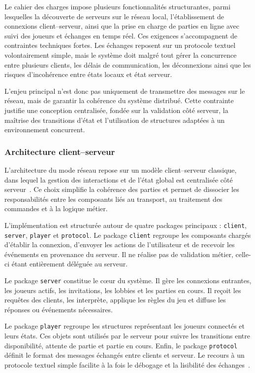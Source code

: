 \documentclass[a4paper]{article}
\begin{document}
Le cahier des charges impose plusieurs fonctionnalités structurantes, parmi lesquelles la découverte de serveurs sur le réseau local, l’établissement de connexions client--serveur, ainsi que la prise en charge de parties en ligne avec suivi des joueurs et échanges en temps réel. Ces exigences s’accompagnent de contraintes techniques fortes. Les échanges reposent sur un protocole textuel volontairement simple, mais le système doit malgré tout gérer la concurrence entre plusieurs clients, les délais de communication, les déconnexions ainsi que les risques d’incohérence entre états locaux et état serveur.

L’enjeu principal n’est donc pas uniquement de transmettre des messages sur le réseau, mais de garantir la cohérence du système distribué. Cette contrainte justifie une conception centralisée, fondée sur la validation côté serveur, la maîtrise des transitions d’état et l’utilisation de structures adaptées à un environnement concurrent.

\subsubsection{Architecture client--serveur}

L’architecture du mode réseau repose sur un modèle client--serveur classique, dans lequel la gestion des interactions et de l’état global est centralisée côté serveur~\cite{client_server}. Ce choix simplifie la cohérence des parties et permet de dissocier les responsabilités entre les composants liés au transport, au traitement des commandes et à la logique métier.

L’implémentation est structurée autour de quatre packages principaux : \texttt{client}, \texttt{server}, \texttt{player} et \texttt{protocol}. Le package \texttt{client} regroupe les composants chargés d’établir la connexion, d’envoyer les actions de l’utilisateur et de recevoir les événements en provenance du serveur. Il ne réalise pas de validation métier, celle-ci étant entièrement déléguée au serveur.

Le package \texttt{server} constitue le cœur du système. Il gère les connexions entrantes, les joueurs actifs, les invitations, les lobbies et les parties en cours. Il reçoit les requêtes des clients, les interprète, applique les règles du jeu et diffuse les réponses ou événements nécessaires.

Le package \texttt{player} regroupe les structures représentant les joueurs connectés et leurs états. Ces objets sont utilisés par le serveur pour suivre les transitions entre disponibilité, attente de partie et partie en cours. Enfin, le package \texttt{protocol} définit le format des messages échangés entre clients et serveur. Le recours à un protocole textuel simple facilite à la fois le débogage et la lisibilité des échanges~\cite{ascii_protocol}.
\end{document}
